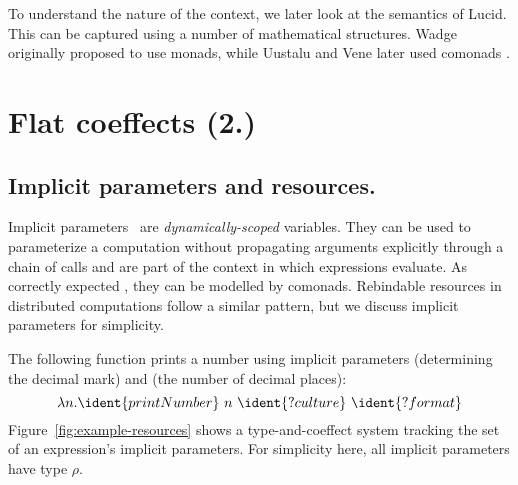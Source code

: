 To understand the nature of the context, we later look at the semantics of Lucid. This can be
captured using a number of mathematical structures. Wadge \cite{app-lucid-monads} originally 
proposed to use monads, while Uustalu and Vene later used comonads \cite{app-dataflow-essence}.


\section{Flat coeffects (2.)}

\subsection{Implicit parameters and resources.}
\label{sec:coeffects-res}

Implicit parameters~\cite{app-implicit-parameters} are \emph{dynamically-scoped} variables.
They can be used to parameterize a computation without propagating arguments explicitly through a 
chain of calls and are part of the context in which expressions evaluate. As correctly expected
\cite{app-implicit-parameters}, they can be modelled by comonads. Rebindable resources in distributed
computations follow a similar pattern, but we discuss implicit parameters for simplicity.

The following function prints a number using implicit parameters
 (determining the decimal mark) and 
(the number of decimal places):
%
\begin{equation*}
\lambda n . \ident{printNumber}~n~\ident{?culture}~\ident{?format}
\end{equation*}
%
Figure~\ref{fig:example-resources} shows a type-and-coeffect system
tracking the set of an expression's implicit parameters. 
For simplicity here, all implicit parameters have type $\rho$.

